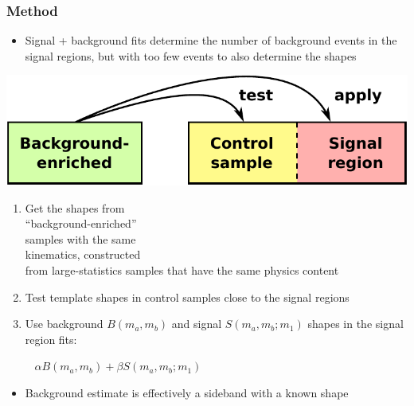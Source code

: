 \documentclass[compress]{beamer}
\begin{document}
\begin{frame}
\frametitle{Method}

\begin{itemize}
\item Signal + background fits determine the number of background
  events in the signal regions, but with too few events to also
  determine the shapes
\end{itemize}

\vspace{-0.45 cm}
\hfill \includegraphics[width=0.5\linewidth]{bkgnd_control_signal.pdf}

\vspace{-1.6 cm}
\begin{enumerate}
\item Get the shapes from \\ ``background-enriched'' \\ samples with the same \\ kinematics, constructed \\ from large-statistics samples that have the same physics content

\item Test template shapes in control samples close to the signal regions

\item Use background $B(m_a, m_b)$ and signal $S(m_a, m_b; m_1)$ shapes in the signal region fits:

\mbox{ } \hfill $\alpha B(m_a, m_b) + \beta S(m_a, m_b; m_1)$ \hfill \mbox{ }
\end{enumerate}

\begin{itemize}
\item Background estimate is effectively a sideband with a known shape
\end{itemize}
\end{frame}
\end{document}

